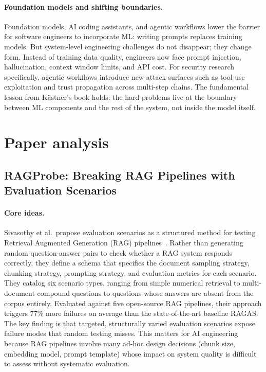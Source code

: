 \documentclass[a4paper,11pt]{article}
\theoremstyle{plain}
\begin{document}
\paragraph{Foundation models and shifting boundaries.}
Foundation models, AI coding assistants, and agentic workflows lower the barrier for software engineers to incorporate ML: writing prompts replaces training models. But system-level engineering challenges do not disappear; they change form. Instead of training data quality, engineers now face prompt injection, hallucination, context window limits, and API cost. For security research specifically, agentic workflows introduce new attack surfaces such as tool-use exploitation and trust propagation across multi-step chains. The fundamental lesson from Kästner's book holds: the hard problems live at the boundary between ML components and the rest of the system, not inside the model itself.

\section{Paper analysis}
\subsection{RAGProbe: Breaking RAG Pipelines with Evaluation Scenarios}\label{sec-rag}

\paragraph{Core ideas.}
Sivasothy et al.\ propose evaluation scenarios as a structured method for testing Retrieval Augmented Generation (RAG) pipelines~\cite{sivasothy2025ragprobe}. Rather than generating random question-answer pairs to check whether a RAG system responds correctly, they define a schema that specifies the document sampling strategy, chunking strategy, prompting strategy, and evaluation metrics for each scenario. They catalog six scenario types, ranging from simple numerical retrieval to multi-document compound questions to questions whose answers are absent from the corpus entirely. Evaluated against five open-source RAG pipelines, their approach triggers 77\% more failures on average than the state-of-the-art baseline RAGAS. The key finding is that targeted, structurally varied evaluation scenarios expose failure modes that random testing misses. This matters for AI engineering because RAG pipelines involve many ad-hoc design decisions (chunk size, embedding model, prompt template) whose impact on system quality is difficult to assess without systematic evaluation.
\end{document}
